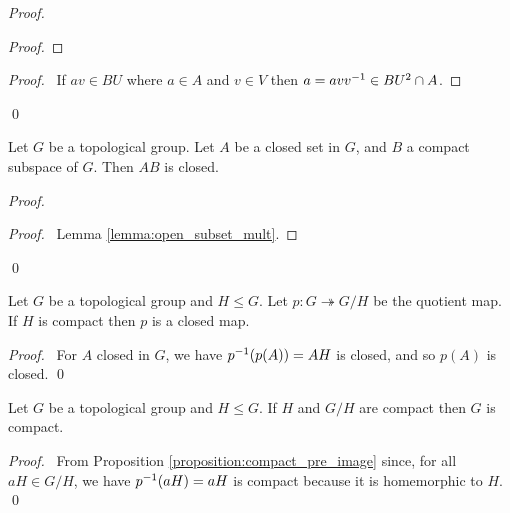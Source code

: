 \begin{proof}
    \pf
    \begin{proof}
    \end{proof}
    \begin{proof}
        \pf\ If $av \in BU$ where $a \in A$ and $v \in V$ then $a = a v {v}^{-1} \in BU^2 \cap A$.
    \end{proof}
    \qed
\end{proof}

\begin{proposition}[AC]
    Let $G$ be a topological group. Let $A$ be a closed set in $G$, and $B$ a compact subspace of $G$. Then $AB$ is closed.
\end{proposition}

\begin{proof}
    \pf
    \begin{proof}
        \pf\ Lemma \ref{lemma:open_subset_mult}.
    \end{proof}
    \qed
\end{proof}

\begin{corollary}
    Let $G$ be a topological group and $H \leq G$. Let $p : G \twoheadrightarrow G / H$ be the quotient map.
    If $H$ is compact then $p$ is a closed map.
\end{corollary}

\begin{proof}
    \pf\ For $A$ closed in $G$, we have ${p}^{-1}(p(A)) = AH$ is closed, and so
    $p(A)$ is closed. \qed
\end{proof}

\begin{corollary}
    Let $G$ be a topological group and $H \leq G$. If $H$ and $G / H$ are compact then $G$ is compact.
\end{corollary}

\begin{proof}
    \pf\ From Proposition \ref{proposition:compact_pre_image} since, for all $aH \in G / H$,
    we have ${p}^{-1}(aH) = aH$ is compact because it is homemorphic to $H$. \qed
\end{proof}


